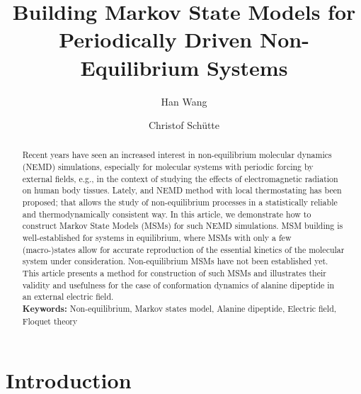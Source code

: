 \documentclass[journal=jctcce,manuscript=article]{achemso}
\title{Building Markov State Models for Periodically Driven Non-Equilibrium Systems}
\author{Han Wang}
\affiliation{CAEP Software Center for High Performance Numerical Simulation, Beijing, China}
\author{Christof Sch\"utte}
\affiliation{Institute for Mathematics, Freie Universit\"at Berlin, Germany}
\begin{document}
   
\begin{abstract}
Recent years have seen an increased interest in non-equilibrium molecular dynamics (NEMD) simulations, especially for molecular systems with periodic forcing by external fields, e.g., in the context of studying the  effects of electromagnetic radiation on human body tissues. Lately, and NEMD method with local thermostating has been proposed; that allows the study of 
non-equilibrium processes in a statistically reliable and thermodynamically consistent way. In this article, we demonstrate how to construct Markov State Models (MSMs) for such NEMD simulations. MSM building is well-established for systems in equilibrium, where MSMs with only a few (macro-)states allow for accurate reproduction of the essential kinetics of the molecular system under consideration. Non-equilibrium MSMs have not been established yet. This article presents a method for construction of such MSMs and illustrates their validity and usefulness for the case of conformation dynamics of alanine dipeptide in an external electric field.  \\
\textbf{Keywords:} {Non-equilibrium, Markov states model, Alanine dipeptide, Electric field, Floquet theory}
\end{abstract}


\maketitle

\section{Introduction}
\end{document}
